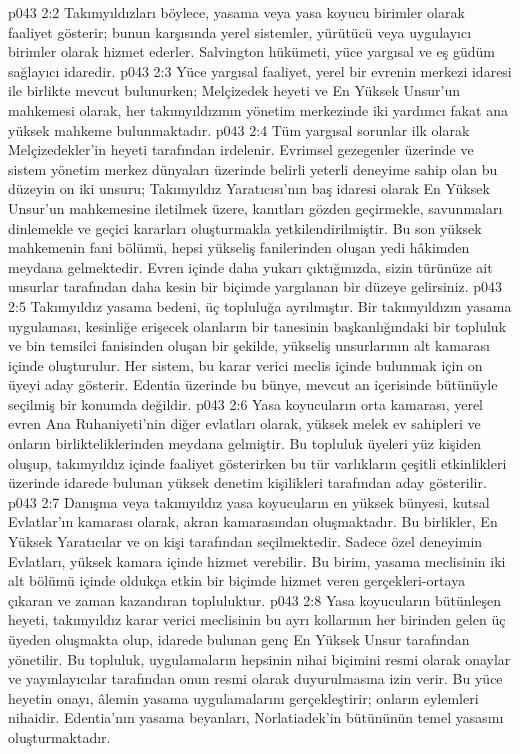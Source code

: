 \vs p043 2:2 Takımyıldızları böylece, yasama veya yasa koyucu birimler olarak faaliyet gösterir; bunun karşısında yerel sistemler, yürütücü veya uygulayıcı birimler olarak hizmet ederler. Salvington hükümeti, yüce yargısal ve eş güdüm sağlayıcı idaredir.
\vs p043 2:3 Yüce yargısal faaliyet, yerel bir evrenin merkezi idaresi ile birlikte mevcut bulunurken; Melçizedek heyeti ve En Yüksek Unsur’un mahkemesi olarak, her takımyıldızının yönetim merkezinde iki yardımcı fakat ana yüksek mahkeme bulunmaktadır.
\vs p043 2:4 Tüm yargısal sorunlar ilk olarak Melçizedekler’in heyeti tarafından irdelenir. Evrimsel gezegenler üzerinde ve sistem yönetim merkez dünyaları üzerinde belirli yeterli deneyime sahip olan bu düzeyin on iki unsuru; Takımyıldız Yaratıcısı’nın baş idaresi olarak En Yüksek Unsur’un mahkemesine iletilmek üzere, kanıtları gözden geçirmekle, savunmaları dinlemekle ve geçici kararları oluşturmakla yetkilendirilmiştir. Bu son yüksek mahkemenin fani bölümü, hepsi yükseliş fanilerinden oluşan yedi hâkimden meydana gelmektedir. Evren içinde daha yukarı çıktığınızda, sizin türünüze ait unsurlar tarafından daha kesin bir biçimde yargılanan bir düzeye gelirsiniz.
\vs p043 2:5 Takımyıldız yasama bedeni, üç topluluğa ayrılmıştır. Bir takımyıldızın yasama uygulaması, kesinliğe erişecek olanların bir tanesinin başkanlığındaki bir topluluk ve bin temsilci fanisinden oluşan bir şekilde, yükseliş unsurlarının alt kamarası içinde oluşturulur. Her sistem, bu karar verici meclis içinde bulunmak için on üyeyi aday gösterir. Edentia üzerinde bu bünye, mevcut an içerisinde bütünüyle seçilmiş bir konumda değildir.
\vs p043 2:6 Yasa koyucuların orta kamarası, yerel evren Ana Ruhaniyeti’nin diğer evlatları olarak, yüksek melek ev sahipleri ve onların birlikteliklerinden meydana gelmiştir. Bu topluluk üyeleri yüz kişiden oluşup, takımyıldız içinde faaliyet gösterirken bu tür varlıkların çeşitli etkinlikleri üzerinde idarede bulunan yüksek denetim kişilikleri tarafından aday gösterilir.
\vs p043 2:7 Danışma veya takımyıldız yasa koyucuların en yüksek bünyesi, kutsal Evlatlar’ın kamarası olarak, akran kamarasından oluşmaktadır. Bu birlikler, En Yüksek Yaratıcılar ve on kişi tarafından seçilmektedir. Sadece özel deneyimin Evlatları, yüksek kamara içinde hizmet verebilir. Bu birim, yasama meclisinin iki alt bölümü içinde oldukça etkin bir biçimde hizmet veren gerçekleri\hyp{}ortaya çıkaran ve zaman kazandıran topluluktur.
\vs p043 2:8 Yasa koyucuların bütünleşen heyeti, takımyıldız karar verici meclisinin bu ayrı kollarının her birinden gelen üç üyeden oluşmakta olup, idarede bulunan genç En Yüksek Unsur tarafından yönetilir. Bu topluluk, uygulamaların hepsinin nihai biçimini resmi olarak onaylar ve yayınlayıcılar tarafından onun resmi olarak duyurulmasına izin verir. Bu yüce heyetin onayı, âlemin yasama uygulamalarını gerçekleştirir; onların eylemleri nihaidir. Edentia’nın yasama beyanları, Norlatiadek’in bütününün temel yasasını oluşturmaktadır.

